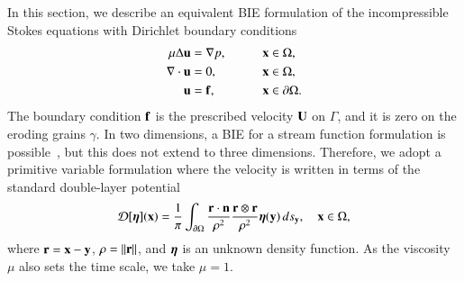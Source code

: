 \documentclass[preprint, 10pt]{elsarticle}
\begin{document}
In this section, we describe an equivalent BIE formulation of the
incompressible Stokes equations with Dirichlet boundary conditions
\begin{equation}
  \begin{split}
  \mu\Delta {\mathbf{u}} &= {\nabla} p, \qquad && {\mathbf{x}} \in \Omega, \\
  {\nabla} \cdot {\mathbf{u}} &= 0,   && {\mathbf{x}} \in \Omega, \\
  {\mathbf{u}} &= {\mathbf{f}},  && {\mathbf{x}} \in {\partial}\Omega.
  \end{split}
  \label{eqn:stokes}
\end{equation}
The boundary condition ${\mathbf{f}}$ is the prescribed velocity ${\mathbf{U}}$ on
$\Gamma$, and it is zero on the eroding grains $\gamma$.  In two
dimensions, a BIE for a stream function formulation is
possible~\cite{gre-kro-may1996}, but this does not extend to three
dimensions.  Therefore, we adopt a primitive variable formulation where
the velocity is written in terms of the standard double-layer
potential~\cite{lad1963,poz1992}
\begin{align}
  {\mathcal{D}}[{\boldsymbol\eta}]({\mathbf{x}}) = \frac{1}{\pi} \int_{{\partial}\Omega} 
    \frac{{\mathbf{r}} \cdot {\mathbf{n}}}{\rho^2} \frac{{\mathbf{r}} \otimes {\mathbf{r}}}{\rho^2} 
    {\boldsymbol\eta}({\mathbf{y}}) \, ds_{\mathbf{y}}, \quad {\mathbf{x}} \in \Omega,
    \label{eqn:velocityDLP}
\end{align}
where ${\mathbf{r}} = {\mathbf{x}} - {\mathbf{y}}$, $\rho = \|{\mathbf{r}}\|$, and ${\boldsymbol\eta}$ is an unknown
density function.  As the viscosity $\mu$ also sets the time scale, we
take $\mu=1$.   
\end{document}
